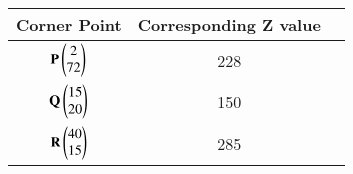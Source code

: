 
\begin{center}
\begin{tabular}{|c|c|c|}
\hline
\textbf{Corner Point}& \textbf{Corresponding Z value} \\ \hline
$\mathbf{P}\begin{pmatrix}2 \\ 72\end{pmatrix}$		 &	228\\ \hline
$\mathbf{Q}\begin{pmatrix}15 \\ 20\end{pmatrix}$     &	150\\ \hline
$\mathbf{R}\begin{pmatrix}40 \\ 15\end{pmatrix}$     &  285\\ \hline
\end{tabular}
\end{center}
